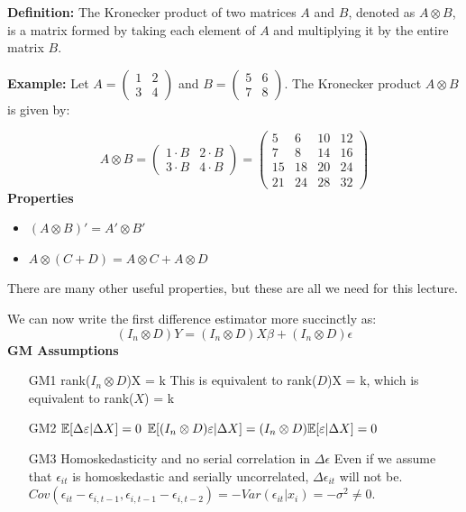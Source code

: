 \documentclass[DIV=14,titlepage=false]{scrreprt}
\begin{document}
\begin{note}
\textbf{Definition:} The Kronecker product of two matrices $A$ and $B$, denoted as $A \otimes B$, is a matrix formed by taking each element of $A$ and multiplying it by the entire matrix $B$.

\textbf{Example:} Let $A = \begin{pmatrix} 1 & 2 \\ 3 & 4 \end{pmatrix}$ and $B = \begin{pmatrix} 5 & 6 \\ 7 & 8 \end{pmatrix}$. The Kronecker product $A \otimes B$ is given by:

\[
A \otimes B = \begin{pmatrix} 1 \cdot B & 2 \cdot B \\ 3 \cdot B & 4 \cdot B \end{pmatrix} = \begin{pmatrix} 5 & 6 & 10 & 12 \\ 7 & 8 & 14 & 16 \\ 15 & 18 & 20 & 24 \\ 21 & 24 & 28 & 32 \end{pmatrix}
\]
\textbf{Properties}
\begin{itemize}
    \item  $(A \otimes B)' = A' \otimes B'$
    \item $A\otimes(C + D) = A\otimes C + A\otimes D$
\end{itemize}
There are many other useful properties, but these are all we need for this lecture.
\end{note}
We can now write the first difference estimator more succinctly as:
\[
    (I_n \otimes D)Y = (I_n \otimes D)X \beta + (I_n \otimes D) \epsilon
\]
\textbf{GM Assumptions}
\begin{itemize}
    \item[GM1] rank($I_n \otimes D$)X = k
    \subitem This is equivalent to rank($D$)X = k, which is equivalent to rank($X$) = k
    \item[GM2] $\mathbb{E}[\Delta \varepsilon | \Delta X] = 0$
    \subitem $\mathbb{E}[(I_n \otimes D) \varepsilon | \Delta X] = (I_n \otimes D)\mathbb{E}[\varepsilon|\Delta X] = 0$
    \item[GM3] Homoskedasticity and no serial correlation in $\Delta \epsilon$
    \subitem Even if we assume that $\epsilon_{it}$ is homoskedastic and serially uncorrelated, $\Delta \epsilon_{it}$ will not be. $Cov(\epsilon_{it}-\epsilon_{i,t-1},\epsilon_{i,t-1}-\epsilon_{i,t-2}) = -Var(\epsilon_{it}|x_i) = -\sigma^2 \not = 0$.
\end{itemize}
\end{document}

